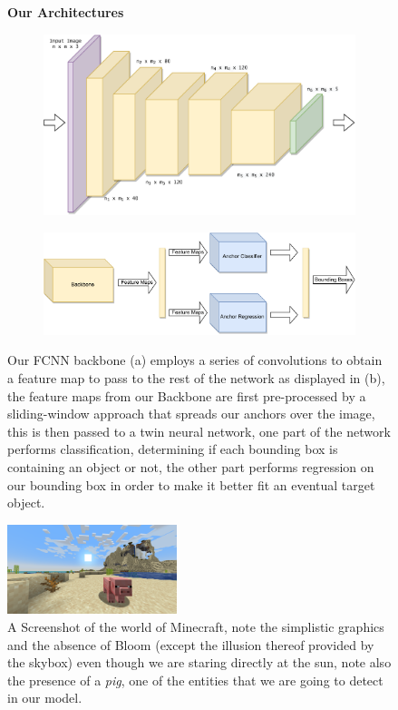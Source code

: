\documentclass[10pt,journal,cspaper,compsoc]{IEEEtran}
\newcommand*{\figuretitle}[1]{%
    {\centering%
    \textbf{#1}%
    \par\medskip}%
}
\begin{document}
\begin{figure}[tb]
    \centering
    \figuretitle{Our Architectures}
    \begin{subfigure}[t]{0.49\linewidth}
        \centering
        \includegraphics[width=1\textwidth,valign=c]{images/backbone.pdf}
    \end{subfigure}
    \hfill
    \begin{subfigure}[t]{0.49\linewidth}
        \centering
        \includegraphics[width=1\textwidth,valign=c]{images/network.pdf}
    \end{subfigure}
    \caption{Our FCNN backbone (a) employs a series of convolutions to obtain a feature map to pass to 
    the rest of the network as displayed in (b), the feature maps from our Backbone are first pre-processed
    by a sliding-window approach that spreads our anchors over the image, this is then passed to a twin neural
    network, one part of the network performs classification, determining if each bounding box is containing an
    object or not, the other part performs regression on our bounding box in order to make it better fit an eventual
    target object.}
    \label{fig:network}
\end{figure}


\begin{figure}[tb]
    \centering
    \includegraphics[width=0.44\textwidth]{images/pig.png}
    \caption{A Screenshot of the world of Minecraft, note the simplistic graphics and the absence of Bloom (except the illusion thereof provided by the 
    skybox) even though we are staring directly at the sun, note also the presence of a \emph{pig}, one of the entities that we are going to detect 
    in our model.}
    \label{fig:piggy}
\end{figure}
\end{document}
